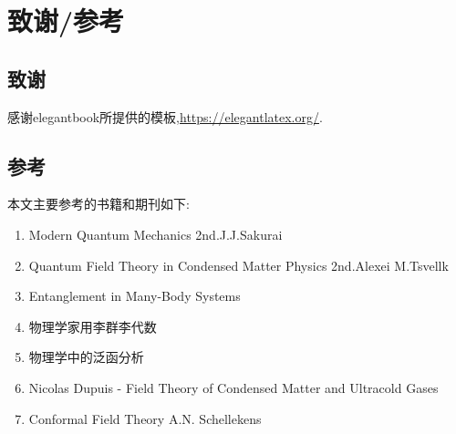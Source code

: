 \chapter{致谢/参考}
\section{致谢}
感谢elegantbook所提供的模板,\href{https://elegantlatex.org/}{https://elegantlatex.org/}.\\

\section{参考}
本文主要参考的书籍和期刊如下:
\begin{enumerate}
	\item Modern Quantum Mechanics 2nd.J.J.Sakurai
	\item Quantum Field Theory in Condensed Matter Physics 2nd.Alexei M.Tsvellk
	\item Entanglement in Many-Body Systems
	\item 物理学家用李群李代数
	\item 物理学中的泛函分析
	\item Nicolas Dupuis - Field Theory of Condensed Matter and Ultracold Gases
	\item Conformal Field Theory A.N. Schellekens
\end{enumerate}


	
	
	
	
\ifx\allfiles\undefined

	\else
	\fi
